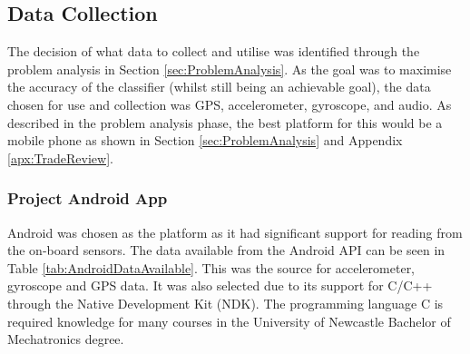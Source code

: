 \documentclass{UoNMCHA}
\newcommand{\sref}[1] {Section \ref{#1}}
\newcommand{\tref}[1] {Table \ref{#1}}
\newcommand{\aref}[1] {Appendix \ref{#1}}
\numberwithin{equation}{section}
\begin{document}
\subsection{Data Collection}

The decision of what data to collect and utilise was identified through the problem analysis in \sref{sec:ProblemAnalysis}. As the goal was to maximise the accuracy of the classifier (whilst still being an achievable goal), the data chosen for use and collection was GPS, accelerometer, gyroscope, and audio. As described in the problem analysis phase, the best platform for this would be a mobile phone as shown in \sref{sec:ProblemAnalysis} and \aref{apx:TradeReview}. 

\subsubsection{Project Android App}
Android was chosen as the platform as it had significant support for reading from the on-board sensors. The data available from the Android API can be seen in \tref{tab:AndroidDataAvailable}. This was the source for accelerometer, gyroscope and GPS data. It was also selected due to its support for C/C++ through the Native Development Kit (NDK). The programming language C is required knowledge for many courses in the University of Newcastle Bachelor of Mechatronics degree. 
\end{document}
